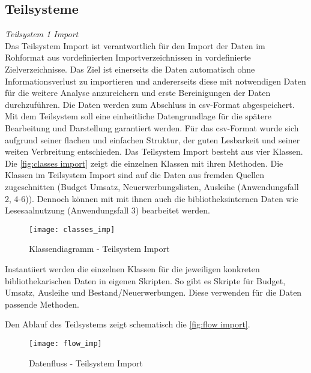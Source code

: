     \subsection{Teilsysteme}
    \label{chap:five_one_three}
    \textit{Teilsystem 1 Import}\\
    Das Teilsystem Import ist verantwortlich für den Import der Daten im Rohformat aus vordefinierten Importverzeichnissen 
    in vordefinierte Zielverzeichnisse. Das Ziel ist einerseits die Daten automatisch ohne Informationsverlust zu importieren 
    und andererseits diese mit notwendigen Daten für die weitere Analyse anzureichern und erste Bereinigungen der Daten durchzuführen. Die Daten werden zum Abschluss in 
    csv-Format abgespeichert. Mit dem Teilsystem soll eine einheitliche Datengrundlage für die spätere Bearbeitung
    und Darstellung garantiert werden.
    Für das csv-Format wurde sich aufgrund seiner flachen und einfachen Struktur, der guten Lesbarkeit
    und seiner weiten Verbreitung entschieden.
    Das Teilsystem Import besteht aus vier Klassen. Die \autoref{fig:classes import} zeigt die einzelnen Klassen mit ihren Methoden.
    Die Klassen im Teilsystem Import sind auf die Daten aus fremden Quellen zugeschnitten
    (Budget Umsatz, Neuerwerbungslisten, Ausleihe (Anwendungsfall 2, 4-6)). Dennoch können mit mit ihnen auch die bibliotheksinternen Daten
    wie Lesesaalnutzung (Anwendungsfall 3) bearbeitet werden. 
    \begin{figure}[H]
        \centering
            \texttt{[image: classes\_imp]}
            \caption{Klassendiagramm - Teilsystem Import}
            \label{fig:classes import}
    \end{figure}

    Instantiiert werden die einzelnen Klassen für die jeweiligen konkreten bibliothekarischen Daten in eigenen Skripten. 
    So gibt es Skripte für Budget, Umsatz, Ausleihe und Bestand/Neuerwerbungen. Diese verwenden für die Daten passende Methoden.
        
    Den Ablauf des Teilsystems zeigt schematisch die \autoref{fig:flow import}.

    \begin{figure}[H]
        \centering
            \texttt{[image: flow\_imp]}
            \caption{Datenfluss - Teilsystem Import}
            \label{fig:flow import}
    \end{figure}

